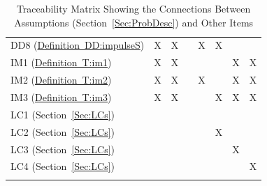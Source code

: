 \documentclass[12pt]{article}
\begin{document}
\begin{longtable}{l l l l l l l l}
DD8 (\hyperref[DD:impulseS]{Definition~DD:impulseS}) & X & X &  & X & X &  & 
\\
IM1 (\hyperref[T:im1]{Definition~T:im1}) & X & X &  &  &  & X & X
\\
IM2 (\hyperref[T:im2]{Definition~T:im2}) & X & X &  & X &  & X & X
\\
IM3 (\hyperref[T:im3]{Definition~T:im3}) & X & X &  &  & X & X & X
\\
LC1 (Section~\ref{Sec:LCs}) &  &  &  &  &  &  & 
\\
LC2 (Section~\ref{Sec:LCs}) &  &  &  &  & X &  & 
\\
LC3 (Section~\ref{Sec:LCs}) &  &  &  &  &  & X & 
\\
LC4 (Section~\ref{Sec:LCs}) &  &  &  &  &  &  & X
\\
\bottomrule
\caption{Traceability Matrix Showing the Connections Between Assumptions (Section~\ref{Sec:ProbDesc}) and Other Items}
\label{Table:TraceyAssumpsOther}
\end{longtable}
\end{document}
